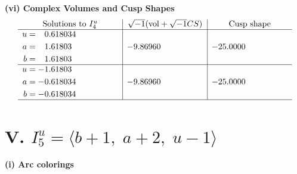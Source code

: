\documentclass[1p]{elsarticle_modified}
\theoremstyle{definition}
\newcommand{\I}{\sqrt{-1}}
\begin{document}
\newpage\flushleft \textbf{(vi) Complex Volumes and Cusp Shapes}
$$\begin{array}{c|c|c}  
\text{Solutions to }I^u_{4}& \I (\text{vol} + \sqrt{-1}CS) & \text{Cusp shape}\\
 \hline 
\begin{aligned}
u &= \phantom{-}0.618034\phantom{ +0.000000I} \\
a &= \phantom{-}1.61803\phantom{ +0.000000I} \\
b &= \phantom{-}1.61803\phantom{ +0.000000I}\end{aligned}
 & -9.86960\phantom{ +0.000000I} & -25.0000\phantom{ +0.000000I} \\ \hline\begin{aligned}
u &= -1.61803\phantom{ +0.000000I} \\
a &= -0.618034\phantom{ +0.000000I} \\
b &= -0.618034\phantom{ +0.000000I}\end{aligned}
 & -9.86960\phantom{ +0.000000I} & -25.0000\phantom{ +0.000000I}\\
 \hline 
 \end{array}$$\newpage\newpage\renewcommand{\arraystretch}{1}
\centering \section*{V. $I^u_{5}= \langle b+1,\;a+2,\;u-1 \rangle$}
\flushleft \textbf{(i) Arc colorings}\\
\end{document}
